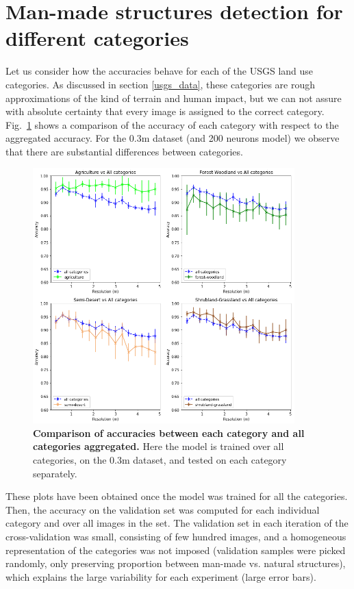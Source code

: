 \section{Man-made structures detection for different categories}

Let us consider how the accuracies behave for each of the USGS land use categories. As discussed in section \ref{usgs_data}, these categories are rough approximations of the kind of terrain and human impact, but we can not assure with absolute certainty that every image is assigned to the correct category. Fig.~\ref{fig:acc_by_cat_03m} shows a comparison of the accuracy of each category with respect to the aggregated accuracy. For the 0.3m dataset (and 200 neurons model) we observe that there are substantial differences between categories. 

\begin{figure}[h!]
	\centering
	\includegraphics[width=0.9\textwidth]{Figures/results/acc_res_by_category_03m.png}
	\captionsetup{width=1\linewidth}
	\caption{\textbf{Comparison of accuracies between each category and all categories aggregated.} Here the model is trained over all categories, on the 0.3m dataset, and tested on each category separately.}
	\label{fig:acc_by_cat_03m}
\end{figure}

These plots have been obtained once the model was trained for all the categories. Then, the accuracy on the validation set was computed for each individual category and over all images in the set. The validation set in each iteration of the cross-validation was small, consisting of few hundred images, and a homogeneous representation of the categories was not imposed (validation samples were picked randomly, only preserving proportion between man-made vs. natural structures), which explains the large variability for each experiment (large error bars).

